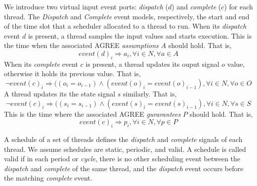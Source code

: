 We introduce two virtual input event ports: \emph{dispatch} ($d$) and \emph{complete} ($c$) for each thread.  The \emph{Dispatch} and \emph{Complete} event models, respectively, the start and end of the time slot that a scheduler allocated to a thread to run. 
When its \emph{dispatch} event $d$ is present, a thread samples the input values and starts execution. This is the time when the associated AGREE \emph{assumptions} $A$ should hold. That is,
$$event(d)_i \Rightarrow a_i, \forall i\in N, \forall a \in A $$
When its \emph{complete} event $c$ is present, a thread updates its ouput signal $o$ value, otherwise it holds its previous value. That is, 
$$\lnot event(c)_i \Rightarrow ((o_i = o_{i-1}) \land (event(o)_i = event(o)_{i-1}), \forall i \in N, \forall o \in O$$
A thread updates its the state signal $s$ similarly. That is,
$$\lnot event(c)_i \Rightarrow ((s_i = s_{i-1}) \land (event(s)_i = event(s)_{i-1}), \forall i \in N, \forall s \in S$$
This is the time where the associated AGREE \emph{gurarantees} $P$ should hold. That is,
$$event(c)_i \Rightarrow p_i, \forall i\in N, \forall p \in P $$


A schedule of a set of threads defines the \emph{dispatch} and \emph{complete} signals of each thread. We assume schedules are static, periodic, and valid. A schedule is called valid if in each period or \emph{cycle}, there is no other scheduling event between the \emph{dispatch} and \emph{complete} of the same thread, and the \emph{dispatch} event occurs before the matching \emph{complete} event. 

